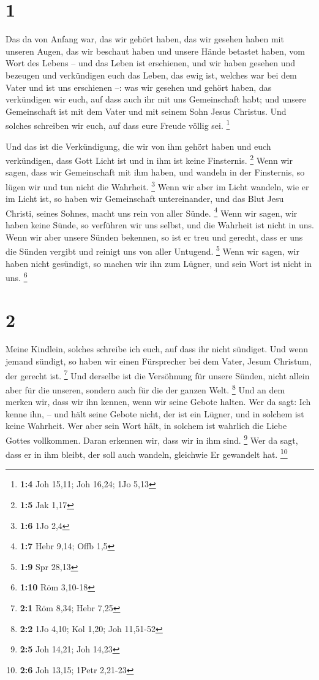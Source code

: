 \hypertarget{section}{%
\section{1}\label{section}}

 Das da von Anfang war, das wir gehört haben, das wir
gesehen haben mit unseren Augen, das wir beschaut haben und unsere Hände
betastet haben, vom Wort des Lebens --  und das Leben ist
erschienen, und wir haben gesehen und bezeugen und verkündigen euch das
Leben, das ewig ist, welches war bei dem Vater und ist uns erschienen
--:  was wir gesehen und gehört haben, das verkündigen wir
euch, auf dass auch ihr mit uns Gemeinschaft habt; und unsere
Gemeinschaft ist mit dem Vater und mit seinem Sohn Jesus Christus.
 Und solches schreiben wir euch, auf dass eure Freude
völlig sei. \footnote{\textbf{1:4} Joh 15,11; Joh 16,24; 1Jo 5,13}

 Und das ist die Verkündigung, die wir von ihm gehört
haben und euch verkündigen, dass Gott Licht ist und in ihm ist keine
Finsternis. \footnote{\textbf{1:5} Jak 1,17}  Wenn wir
sagen, dass wir Gemeinschaft mit ihm haben, und wandeln in der
Finsternis, so lügen wir und tun nicht die Wahrheit. \footnote{\textbf{1:6}
  1Jo 2,4}  Wenn wir aber im Licht wandeln, wie er im
Licht ist, so haben wir Gemeinschaft untereinander, und das Blut Jesu
Christi, seines Sohnes, macht uns rein von aller Sünde. \footnote{\textbf{1:7}
  Hebr 9,14; Offb 1,5}  Wenn wir sagen, wir haben keine
Sünde, so verführen wir uns selbst, und die Wahrheit ist nicht in uns.
 Wenn wir aber unsere Sünden bekennen, so ist er treu und
gerecht, dass er uns die Sünden vergibt und reinigt uns von aller
Untugend. \footnote{\textbf{1:9} Spr 28,13}  Wenn wir
sagen, wir haben nicht gesündigt, so machen wir ihn zum Lügner, und sein
Wort ist nicht in uns. \footnote{\textbf{1:10} Röm 3,10-18}

\hypertarget{section-1}{%
\section{2}\label{section-1}}

 Meine Kindlein, solches schreibe ich euch, auf dass ihr
nicht sündiget. Und wenn jemand sündigt, so haben wir einen Fürsprecher
bei dem Vater, Jesum Christum, der gerecht ist. \footnote{\textbf{2:1}
  Röm 8,34; Hebr 7,25}  Und derselbe ist die Versöhnung
für unsere Sünden, nicht allein aber für die unseren, sondern auch für
die der ganzen Welt. \footnote{\textbf{2:2} 1Jo 4,10; Kol 1,20; Joh
  11,51-52}  Und an dem merken wir, dass wir ihn kennen,
wenn wir seine Gebote halten.  Wer da sagt: Ich kenne ihn,
-- und hält seine Gebote nicht, der ist ein Lügner, und in solchem ist
keine Wahrheit.  Wer aber sein Wort hält, in solchem ist
wahrlich die Liebe Gottes vollkommen. Daran erkennen wir, dass wir in
ihm sind. \footnote{\textbf{2:5} Joh 14,21; Joh 14,23} 
Wer da sagt, dass er in ihm bleibt, der soll auch wandeln, gleichwie Er
gewandelt hat. \footnote{\textbf{2:6} Joh 13,15; 1Petr 2,21-23}

